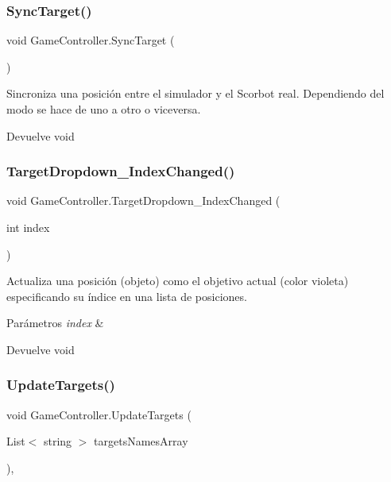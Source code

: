 \subsubsection{\texorpdfstring{SyncTarget()}{SyncTarget()}}
{\footnotesize\ttfamily void Game\+Controller.\+Sync\+Target (\begin{DoxyParamCaption}{ }\end{DoxyParamCaption})\hspace{0.3cm}{\ttfamily [inline]}}

Sincroniza una posición entre el simulador y el Scorbot real. Dependiendo del modo se hace de uno a otro o viceversa. \begin{DoxyReturn}{Devuelve}
void 
\end{DoxyReturn}
\mbox{\label{class_game_controller_a6de8761e6cd2b07a857ea3ec0544fa40}} 
\subsubsection{\texorpdfstring{TargetDropdown\_IndexChanged()}{TargetDropdown\_IndexChanged()}}
{\footnotesize\ttfamily void Game\+Controller.\+Target\+Dropdown\+\_\+\+Index\+Changed (\begin{DoxyParamCaption}\item[{int}]{index }\end{DoxyParamCaption})\hspace{0.3cm}{\ttfamily [inline]}}

Actualiza una posición (objeto) como el objetivo actual (color violeta) especificando su índice en una lista de posiciones. 
\begin{DoxyParams}{Parámetros}
{\em index} & \\
\hline
\end{DoxyParams}
\begin{DoxyReturn}{Devuelve}
void 
\end{DoxyReturn}
\mbox{\label{class_game_controller_a0faec72a151b40bb1a13340f89a735aa}} 
\subsubsection{\texorpdfstring{UpdateTargets()}{UpdateTargets()}}
{\footnotesize\ttfamily void Game\+Controller.\+Update\+Targets (\begin{DoxyParamCaption}\item[{List$<$ string $>$}]{targets\+Names\+Array }\end{DoxyParamCaption})\hspace{0.3cm}{\ttfamily [inline]}, {\ttfamily [private]}}

